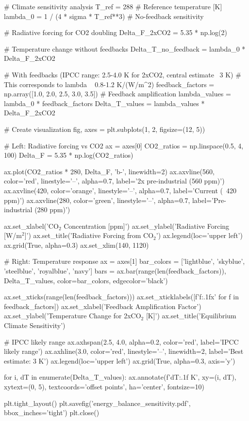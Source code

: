 \documentclass[11pt,a4paper]{article}
\begin{document}
\begin{pycode}
# Climate sensitivity analysis
T_ref = 288  # Reference temperature [K]
lambda_0 = 1 / (4 * sigma * T_ref**3)  # No-feedback sensitivity

# Radiative forcing for CO2 doubling
Delta_F_2xCO2 = 5.35 * np.log(2)

# Temperature change without feedbacks
Delta_T_no_feedback = lambda_0 * Delta_F_2xCO2

# With feedbacks (IPCC range: 2.5-4.0 K for 2xCO2, central estimate ~3 K)
# This corresponds to lambda ~ 0.8-1.2 K/(W/m^2)
feedback_factors = np.array([1.0, 2.0, 2.5, 3.0, 3.5])  # Feedback amplification
lambda_values = lambda_0 * feedback_factors
Delta_T_values = lambda_values * Delta_F_2xCO2

# Create visualization
fig, axes = plt.subplots(1, 2, figsize=(12, 5))

# Left: Radiative forcing vs CO2
ax = axes[0]
CO2_ratios = np.linspace(0.5, 4, 100)
Delta_F = 5.35 * np.log(CO2_ratios)

ax.plot(CO2_ratios * 280, Delta_F, 'b-', linewidth=2)
ax.axvline(560, color='red', linestyle='--', alpha=0.7, label='2x pre-industrial (560 ppm)')
ax.axvline(420, color='orange', linestyle='--', alpha=0.7, label='Current (~420 ppm)')
ax.axvline(280, color='green', linestyle='--', alpha=0.7, label='Pre-industrial (280 ppm)')

ax.set_xlabel('CO$_2$ Concentration [ppm]')
ax.set_ylabel('Radiative Forcing [W/m$^2$]')
ax.set_title('Radiative Forcing from CO$_2$')
ax.legend(loc='upper left')
ax.grid(True, alpha=0.3)
ax.set_xlim(140, 1120)

# Right: Temperature response
ax = axes[1]
bar_colors = ['lightblue', 'skyblue', 'steelblue', 'royalblue', 'navy']
bars = ax.bar(range(len(feedback_factors)), Delta_T_values,
              color=bar_colors, edgecolor='black')

ax.set_xticks(range(len(feedback_factors)))
ax.set_xticklabels([f'{f:.1f}x' for f in feedback_factors])
ax.set_xlabel('Feedback Amplification Factor')
ax.set_ylabel('Temperature Change for 2xCO$_2$ [K]')
ax.set_title('Equilibrium Climate Sensitivity')

# IPCC likely range
ax.axhspan(2.5, 4.0, alpha=0.2, color='red', label='IPCC likely range')
ax.axhline(3.0, color='red', linestyle='--', linewidth=2, label='Best estimate: 3 K')
ax.legend(loc='upper left')
ax.grid(True, alpha=0.3, axis='y')

for i, dT in enumerate(Delta_T_values):
    ax.annotate(f'{dT:.1f} K', xy=(i, dT), xytext=(0, 5),
                textcoords='offset points', ha='center', fontsize=10)

plt.tight_layout()
plt.savefig('energy_balance_sensitivity.pdf', bbox_inches='tight')
plt.close()
\end{pycode}
\end{document}
